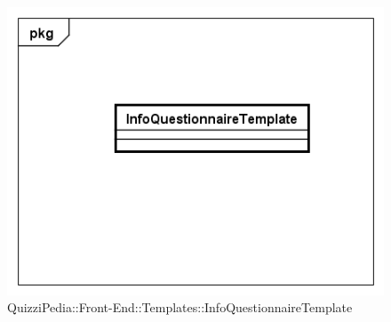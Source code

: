 		\begin{figure}[ht]
			\centering
			\includegraphics[scale=0.5,keepaspectratio]{UML/Classi/Front-End/QuizziPedia_Front-end_Templates_InfoQuestionnaireTemplate.png}
			\caption{QuizziPedia::Front-End::Templates::InfoQuestionnaireTemplate}
		\end{figure} \FloatBarrier
		
